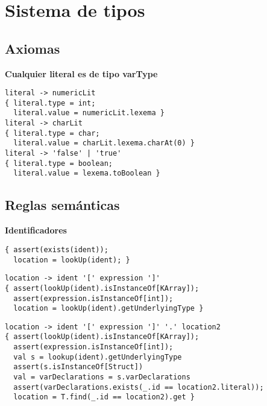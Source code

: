 \documentclass[12pt,letterpaper]{article}
\begin{document}
\section*{Sistema de tipos}
\subsection*{Axiomas}

\textbf{Cualquier literal es de tipo varType}
\begin{lstlisting}
literal -> numericLit
{ literal.type = int;
  literal.value = numericLit.lexema }
literal -> charLit
{ literal.type = char;
  literal.value = charLit.lexema.charAt(0) }
literal -> 'false' | 'true'
{ literal.type = boolean;
  literal.value = lexema.toBoolean }
\end{lstlisting}

\subsection*{Reglas sem\'{a}nticas}
\textbf{Identificadores}
\begin{lstlisting}
{ assert(exists(ident));
  location = lookUp(ident); }  
\end{lstlisting}

\begin{lstlisting}
location -> ident '[' expression ']' 
{ assert(lookUp(ident).isInstanceOf[KArray]);
  assert(expression.isInstanceOf[int]);
  location = lookUp(ident).getUnderlyingType }
\end{lstlisting}

\begin{lstlisting}
location -> ident '[' expression ']' '.' location2
{ assert(lookUp(ident).isInstanceOf[KArray]);  
  assert(expression.isInstanceOf[int]);
  val s = lookup(ident).getUnderlyingType
  assert(s.isInstanceOf[Struct])
  val = varDeclarations = s.varDeclarations
  assert(varDeclarations.exists(_.id == location2.literal));
  location = T.find(_.id == location2).get }
\end{lstlisting}
\end{document}
